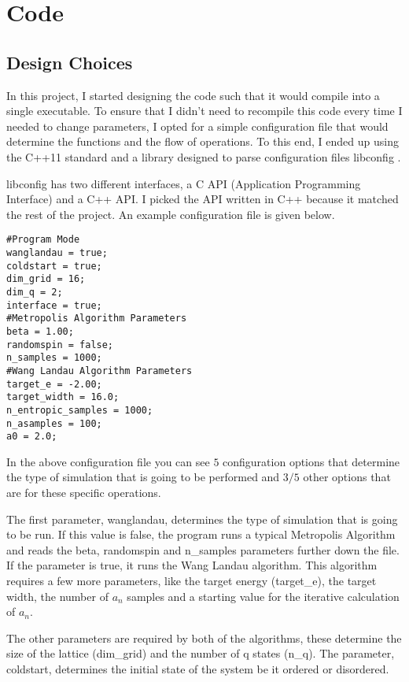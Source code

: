 \chapter{Code}

\section{Design Choices}
In this project, I started designing the code such that it would compile into a single executable.
To ensure that I didn't need to recompile this code every time I needed to change parameters, I opted for a simple configuration file that would determine the functions and the flow of operations.
To this end, I ended up using the C++11 standard\cite{2011-C++} and a library designed to parse configuration files libconfig \cite{Lindner2012}.

libconfig has two different interfaces, a C API (Application Programming Interface) and a C++ API. I picked the API written in C++ because it matched the rest of the project.
An example configuration file is given below.
\begin{verbatim}
#Program Mode
wanglandau = true;
coldstart = true;
dim_grid = 16;
dim_q = 2;
interface = true;
#Metropolis Algorithm Parameters
beta = 1.00;
randomspin = false;
n_samples = 1000;
#Wang Landau Algorithm Parameters
target_e = -2.00;
target_width = 16.0;
n_entropic_samples = 1000;
n_asamples = 100;
a0 = 2.0;
\end{verbatim}

In the above configuration file you can see $5$ configuration options that determine the type of simulation that is going to be performed and $3/5$ other options that are for these specific operations.

The first parameter, wanglandau, determines the type of simulation that is going to be run. If this value is false, the program runs a typical Metropolis Algorithm and reads the beta, randomspin and n\_samples parameters further down the file. If the parameter is true, it runs the Wang Landau algorithm. This algorithm requires a few more parameters, like the target energy (target\_e), the target width, the number of $a_n$ samples and a starting value for the iterative calculation of $a_n$.

The other parameters are required by both of the algorithms, these determine the size of the lattice (dim\_grid) and the number of q states (n\_q). The parameter, coldstart, determines the initial state of the system be it ordered or disordered.

